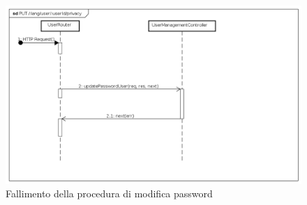 \begin{itemize}
\label{Fallimento della procedura di modifica password}
\begin{figure}[ht]
	\centering
	\includegraphics[scale=0.40]{UML/DiagrammiDiSequenza/Back-end/PUT_LangUserUserIdPrivacyFailure.png}	
	\caption{Fallimento della procedura di modifica password}
\end{figure}
\FloatBarrier
\end{itemize}


